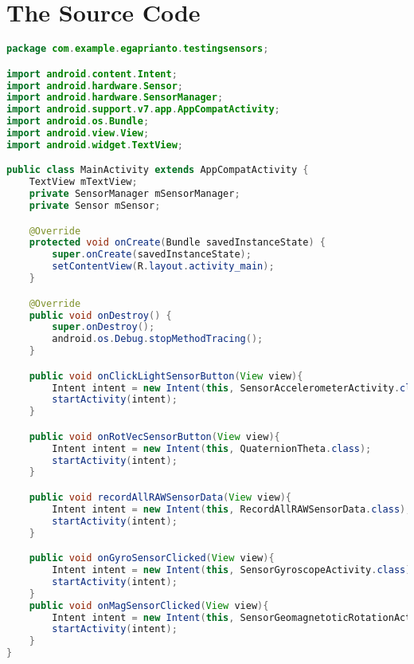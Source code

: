 \chapter{The Source Code}
\label{app:B}

\singlespacing 
%
%
\begin{lstlisting}[language=Java,basicstyle=\tiny,caption=MainActivity.java]
package com.example.egaprianto.testingsensors;

import android.content.Intent;
import android.hardware.Sensor;
import android.hardware.SensorManager;
import android.support.v7.app.AppCompatActivity;
import android.os.Bundle;
import android.view.View;
import android.widget.TextView;

public class MainActivity extends AppCompatActivity {
    TextView mTextView; 
    private SensorManager mSensorManager;
    private Sensor mSensor;

    @Override
    protected void onCreate(Bundle savedInstanceState) {
        super.onCreate(savedInstanceState);
        setContentView(R.layout.activity_main);
    }

    @Override
    public void onDestroy() {
        super.onDestroy();
        android.os.Debug.stopMethodTracing();
    }

    public void onClickLightSensorButton(View view){
        Intent intent = new Intent(this, SensorAccelerometerActivity.class);
        startActivity(intent);
    }

    public void onRotVecSensorButton(View view){
        Intent intent = new Intent(this, QuaternionTheta.class);
        startActivity(intent);
    }

    public void recordAllRAWSensorData(View view){
        Intent intent = new Intent(this, RecordAllRAWSensorData.class);
        startActivity(intent);
    }

    public void onGyroSensorClicked(View view){
        Intent intent = new Intent(this, SensorGyroscopeActivity.class);
        startActivity(intent);
    }
    public void onMagSensorClicked(View view){
        Intent intent = new Intent(this, SensorGeomagnetoticRotationActivity.class);
        startActivity(intent);
    }
}

\end{lstlisting}

